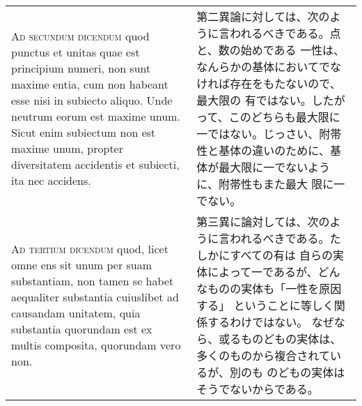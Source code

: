 \documentclass[10pt]{jsarticle} %
\begin{document}
\begin{longtable}{p{21em}p{21em}}
{\scshape Ad secundum dicendum} quod punctus et unitas quae est principium
numeri, non sunt maxime entia, cum non habeant esse nisi in subiecto
aliquo. Unde neutrum eorum est maxime unum. Sicut enim subiectum non est
maxime unum, propter diversitatem accidentis et subiecti, ita nec
accidens.

&

第二異論に対しては、次のように言われるべきである。点と、数の始めである
一性は、なんらかの基体においてでなければ存在をもたないので、最大限の
有ではない。したがって、このどちらも最大限に一ではない。じっさい、附帯
性と基体の違いのために、基体が最大限に一でないように、附帯性もまた最大
限に一でない。

\\

{\scshape Ad tertium dicendum} quod, licet omne ens sit unum per suam
substantiam, non tamen se habet aequaliter substantia cuiuslibet ad
causandam unitatem, quia substantia quorundam est ex multis composita,
quorundam vero non.

&

第三異に論対しては、次のように言われるべきである。たしかにすべての有は
自らの実体によって一であるが、どんなものの実体も「一性を原因する」
ということに等しく関係するわけではない。
なぜなら、或るものどもの実体は、多くのものから複合されているが、別のも
のどもの実体はそうでないからである。


\end{longtable}
\end{document}
